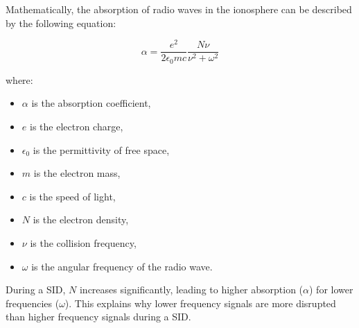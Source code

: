 Mathematically, the absorption of radio waves in the ionosphere can be described by the following equation:

\[
\alpha = \frac{e^2}{2 \epsilon_0 m c} \frac{N \nu}{\nu^2 + \omega^2}
\]

where:
\begin{itemize}
    \item \(\alpha\) is the absorption coefficient,
    \item \(e\) is the electron charge,
    \item \(\epsilon_0\) is the permittivity of free space,
    \item \(m\) is the electron mass,
    \item \(c\) is the speed of light,
    \item \(N\) is the electron density,
    \item \(\nu\) is the collision frequency,
    \item \(\omega\) is the angular frequency of the radio wave.
\end{itemize}

During a SID, \(N\) increases significantly, leading to higher absorption (\(\alpha\)) for lower frequencies (\(\omega\)). This explains why lower frequency signals are more disrupted than higher frequency signals during a SID.


